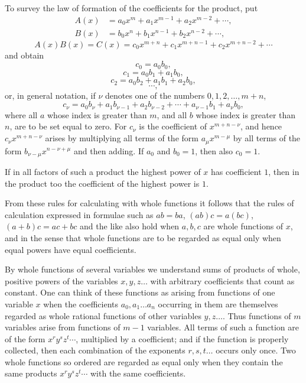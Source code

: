 \documentclass[11pt]{article}
\begin{document}
To survey the law of formation of the coefficients for the product, put
\begin{equation}
\begin{aligned}
 A(x)&=a_0x^m+a_1x^{m-1}+a_2x^{m-2}+\cdots,\\
 B(x)&=b_0x^n+b_1x^{n-1}+b_2x^{n-2}+\cdots,
\end{aligned}
\tag{2}
\end{equation}
\begin{equation}
 A(x)B(x)=C(x)=c_0x^{m+n}+c_1x^{m+n-1}+c_2x^{m+n-2}+\cdots
\tag{3}
\end{equation}
and obtain
\[
 c_0=a_0b_0,
\]
\[
 c_1=a_0b_1+a_1b_0,
\]
\[
 c_2=a_0b_2+a_1b_1+a_2b_0,
\]
\[
 \cdots,
\]
or, in general notation, if $\nu$ denotes one of the numbers $0,1,2,
\ldots,m+n$,
\begin{equation}
 c_\nu=a_0b_\nu+a_1b_{\nu-1}+a_2b_{\nu-2}+\cdots+a_{\nu-1}b_1+a_\nu b_0,
\tag{4}
\end{equation}
where all $a$ whose index is greater than $m$, and all $b$ whose index is greater than $n$, are to be set equal to zero. For $c_\nu$ is the coefficient of $x^{m+n-\nu}$, and hence $c_\nu x^{m+n-\nu}$ arises by multiplying all terms of the form $a_\mu x^{m-\mu}$ by all terms of the form $b_{\nu-\mu}x^{n-\nu+\mu}$ and then adding. If $a_0$ and $b_0=1$, then also $c_0=1$.

If in all factors of such a product the highest power of $x$ has coefficient $1$, then in the product too the coefficient of the highest power is $1$.

From these rules for calculating with whole functions it follows that the rules of calculation expressed in formulae such as $ab=ba$, $(ab)c=a(bc)$, $(a+b)c=ac+bc$ and the like also hold when $a,b,c$ are whole functions of $x$, and in the sense that whole functions are to be regarded as equal only when equal powers have equal coefficients.

By whole functions of several variables we understand sums of products of whole, positive powers of the variables $x,y,z\ldots$ with arbitrary coefficients that count as constant. One can think of these functions as arising from functions of one variable $x$ when the coefficients $a_0,a_1\ldots a_n$ occurring in them are themselves regarded as whole rational functions of other variables $y,z\ldots$. Thus functions of $m$ variables arise from functions of $m-1$ variables. All terms of such a function are of the form $x^r y^s z^t\cdots$, multiplied by a coefficient; and if the function is properly collected, then each combination of the exponents $r,s,t\ldots$ occurs only once. Two whole functions so ordered are regarded as equal only when they contain the same products $x^r y^s z^t\cdots$ with the same coefficients.
\end{document}
